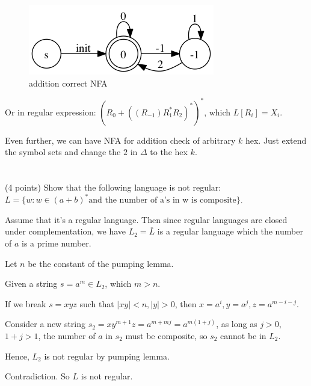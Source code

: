 \documentclass[paper=a4, fontsize=11pt]{scrartcl} %
\begin{document}
\begin{figure}[hp]
  \centering
  \includegraphics[scale=.5]{1-4.gv.png}
  \caption{addition correct NFA}
\end{figure}

Or in regular expression: $(R_{0}+((R_{-1})R_{1}^*R_{2})^*)^*$, which
$L[R_i] = X_i$.

Even further, we can have NFA for addition check of arbitrary $k$ hex.
Just extend the symbol sets and change the $2$ in $\Delta$ to the hex $k$.

\pagebreak

\section{}

\begin{fancyquotes}
  (4 points) Show that the following language is not regular: $L = \{w
  : w \in (a + b)^* \text{and the number of a's in w is composite}\}$.
\end{fancyquotes}

Assume that it's a regular language.
Then since regular languages are closed under complementation,
we have $L_2 = \overline{L}$ is a regular language which the number of
$a$ is a prime number.

Let $n$ be the constant of the pumping lemma.

Given a string $s = a^{m} \in L_2$, which $m>n$.

If we break $s = xyz$ such that $|xy|<n, |y|>0$, then
$x = a^i, y = a^j, z = a^{m-i-j}$.

Consider a new string $s_2 = xy^{m+1}z = a^{m+mj} = a^{m(1+j)}$,
as long as $j>0$, $1+j>1$, the number of $a$ in $s_2$ must be
composite, so $s_2$ cannot be in $L_2$.

Hence, $L_2$ is not regular by pumping lemma.

Contradiction. So $L$ is not regular.
\end{document}
